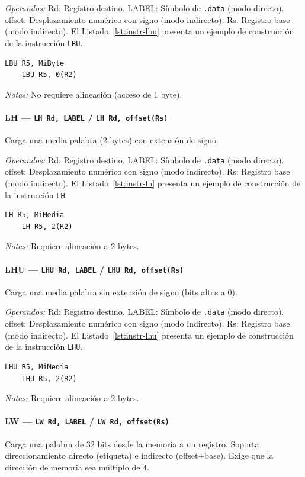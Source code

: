 \documentclass[../main.tex]{subfiles}
\begin{document}
\textit{Operandos:} Rd: Registro destino. LABEL: Símbolo de \texttt{.data} (modo directo). offset: Desplazamiento numérico con signo (modo indirecto). Rs: Registro base (modo indirecto).
El Listado~\ref{lst:instr-lbu} presenta un ejemplo de construcción de la instrucción \texttt{LBU}.

\begin{lstlisting}[caption={LBU},label={lst:instr-lbu}]
	LBU R5, MiByte
	LBU R5, 0(R2)
\end{lstlisting}
\textit{Notas:} No requiere alineación (acceso de 1 byte).

\paragraph*{LH --- \texttt{LH Rd, LABEL} / \texttt{LH Rd, offset(Rs)}}
Carga una media palabra (2 bytes) con extensión de signo.

\textit{Operandos:} Rd: Registro destino. LABEL: Símbolo de \texttt{.data} (modo directo). offset: Desplazamiento numérico con signo (modo indirecto). Rs: Registro base (modo indirecto).
El Listado~\ref{lst:instr-lh} presenta un ejemplo de construcción de la instrucción \texttt{LH}.

\begin{lstlisting}[caption={LH},label={lst:instr-lh}]
	LH R5, MiMedia
	LH R5, 2(R2)
\end{lstlisting}
\textit{Notas:} Requiere alineación a 2 bytes.

\paragraph*{LHU --- \texttt{LHU Rd, LABEL} / \texttt{LHU Rd, offset(Rs)}}
Carga una media palabra sin extensión de signo (bits altos a 0).

\textit{Operandos:} Rd: Registro destino. LABEL: Símbolo de \texttt{.data} (modo directo). offset: Desplazamiento numérico con signo (modo indirecto). Rs: Registro base (modo indirecto).
El Listado~\ref{lst:instr-lhu} presenta un ejemplo de construcción de la instrucción \texttt{LHU}.

\begin{lstlisting}[caption={LHU},label={lst:instr-lhu}]
	LHU R5, MiMedia
	LHU R5, 2(R2)
\end{lstlisting}
\textit{Notas:} Requiere alineación a 2 bytes.

\paragraph*{LW --- \texttt{LW Rd, LABEL} / \texttt{LW Rd, offset(Rs)}}
Carga una palabra de 32 bits desde la memoria a un registro. Soporta direccionamiento directo (etiqueta) e indirecto (offset+base). Exige que la dirección de memoria sea múltiplo de 4.
\end{document}
